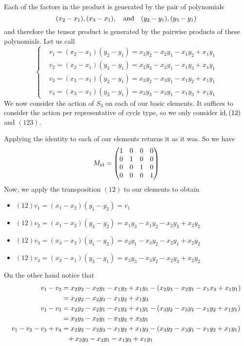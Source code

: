 \documentclass[12pt]{memoir}
\begin{document}
\begin{ptcbr}
Each of the factors in the product is generated by the pair of polynomials 
$$(x_2-x_1),(x_3-x_1),\quad\text{and}\quad(y_2-y_1),(y_3-y_1)$$
and therefore the tensor product is generated by the pairwise products of these polynomials. Let us call 
$$
\left\lbrace
\begin{aligned}
    &v_1=(x_2-x_1)(y_2-y_1)=x_2y_2-x_2y_1-x_1y_2+x_1y_1\\
    &v_2=(x_2-x_1)(y_3-y_1)=x_2y_3-x_2y_1-x_1y_3+x_1y_1\\
    &v_3=(x_3-x_1)(y_2-y_1)=x_3y_2-x_3y_1-x_1y_2+x_1y_1\\
    &v_4=(x_3-x_1)(y_3-y_1)=x_3y_3-x_3y_1-x_1y_3+x_1y_1
\end{aligned}
\right.
$$
We now consider the action of $S_3$ on each of our basic elements. It suffices to consider the action per representative of cycle type, so we only consider $\operatorname{id},(12)$ and $(123)$.\par 
Applying the identity to each of our elements returns it as it was. So we have 
$$M_{\operatorname{id}}=\begin{pmatrix}
    1&0&0&0\\0&1&0&0\\0&0&1&0\\0&0&0&1
\end{pmatrix}$$
Now, we apply the transposition $(12)$ to our elements to obtain 
\begin{itemize}
    \item $(12)v_1=(x_1-x_2)(y_1-y_2)=v_1$
    \item $(12)v_2=(x_1-x_2)(y_3-y_2)=x_1y_3-x_1y_2-x_2y_3+x_2y_2$
    \item $(12)v_3=(x_3-x_2)(y_1-y_2)=x_3y_1-x_3y_2-x_2y_1+x_2y_2$
    \item $(12)v_4=(x_3-x_1)(y_3-y_1)=x_3y_3-x_3y_2-x_2y_3+x_2y_2$
\end{itemize}
On the other hand notice that 
\begin{align*}
    v_1-v_2&=x_2y_2-x_2y_1-x_1y_2+x_1y_1-(x_2y_3-x_2y_1-x_1x_3+x_1y_1)\\
    &=x_2y_2-x_2y_3-x_1y_2+x_1y_3\\
    v_1-v_3&=x_2y_2-x_2y_1-x_1y_2+x_1y_1-(x_3y_2-x_3y_1-x_1y_2+x_1y_1)\\
    &=x_2y_2-x_2y_1-x_3y_2+x_3y_1\\
    v_1-v_2-v_3+v_4&=x_2y_2-x_2y_3-x_1y_2+x_1y_3-(x_3y_2-x_3y_1-x_1y_2+x_1y_1)\\
    &\hphantom{=}+x_3y_3-x_3y_1-x_1y_3+x_1y_1\\

\end{align*}
\end{ptcbr}
\end{document}
